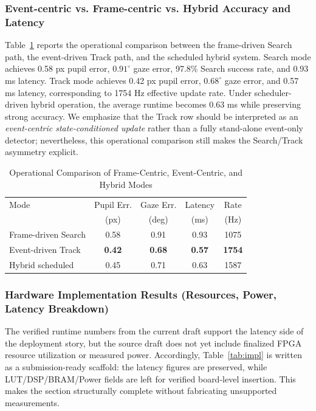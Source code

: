 \documentclass[journal]{IEEEtran}
\begin{document}
\subsubsection{Event-centric vs. Frame-centric vs. Hybrid Accuracy and Latency}
Table~\ref{tab:mode} reports the operational comparison between the frame-driven Search path, the event-driven Track path, and the scheduled hybrid system. Search mode achieves 0.58 px pupil error, $0.91^{\circ}$ gaze error, 97.8\% Search success rate, and 0.93 ms latency. Track mode achieves 0.42 px pupil error, $0.68^{\circ}$ gaze error, and 0.57 ms latency, corresponding to 1754 Hz effective update rate. Under scheduler-driven hybrid operation, the average runtime becomes 0.63 ms while preserving strong accuracy. We emphasize that the Track row should be interpreted as an \emph{event-centric state-conditioned update} rather than a fully stand-alone event-only detector; nevertheless, this operational comparison still makes the Search/Track asymmetry explicit.

\begin{table}[t]
\caption{Operational Comparison of Frame-Centric, Event-Centric, and Hybrid Modes}
\label{tab:mode}
\centering
\footnotesize
\begin{tabular}{p{}c c c c}
\toprule
Mode & Pupil Err. & Gaze Err. & Latency & Rate \\
 & (px) & (deg) & (ms) & (Hz) \\
\midrule
Frame-driven Search & 0.58 & 0.91 & 0.93 & 1075 \\
Event-driven Track & \textbf{0.42} & \textbf{0.68} & \textbf{0.57} & \textbf{1754} \\
Hybrid scheduled & 0.45 & 0.71 & 0.63 & 1587 \\
\bottomrule
\end{tabular}
\end{table}

\subsubsection{Hardware Implementation Results (Resources, Power, Latency Breakdown)}
The verified runtime numbers from the current draft support the latency side of the deployment story, but the source draft does not yet include finalized FPGA resource utilization or measured power. Accordingly, Table~\ref{tab:impl} is written as a submission-ready scaffold: the latency figures are preserved, while LUT/DSP/BRAM/Power fields are left for verified board-level insertion. This makes the section structurally complete without fabricating unsupported measurements.
\end{document}
